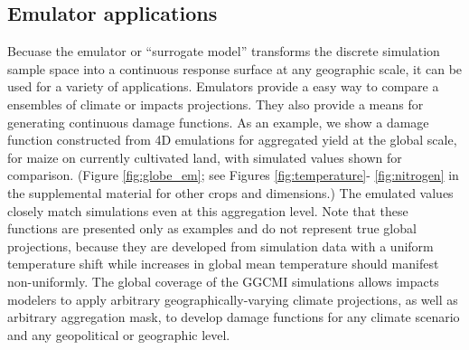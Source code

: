 \documentclass[preprint, 5p, times, twocolumn]{elsarticle}
\begin{document}
\subsection{Emulator applications}
Becuase the emulator or ``surrogate model'' transforms the discrete simulation sample space into a continuous response surface at any geographic scale, it can be used for a variety of applications. Emulators provide a easy way to compare a ensembles of climate or impacts projections. They also provide a means for generating continuous damage functions. As an example, we show a damage function constructed from 4D emulations for aggregated yield at the global scale, for maize on currently cultivated land, with simulated values shown for comparison. (Figure \ref{fig:globe_em};  see Figures \ref{fig:temperature}- \ref{fig:nitrogen} in the supplemental material for other crops and dimensions.) The emulated values closely match simulations even at this aggregation level. Note that these functions are presented only as examples and do not represent true global projections, because they are developed from simulation data with a uniform temperature shift while increases in global mean temperature should manifest non-uniformly. The global coverage of the GGCMI simulations allows impacts modelers to apply arbitrary geographically-varying climate projections, as well as arbitrary aggregation mask, to develop damage functions for any climate scenario and any geopolitical or geographic level.
\end{document}
